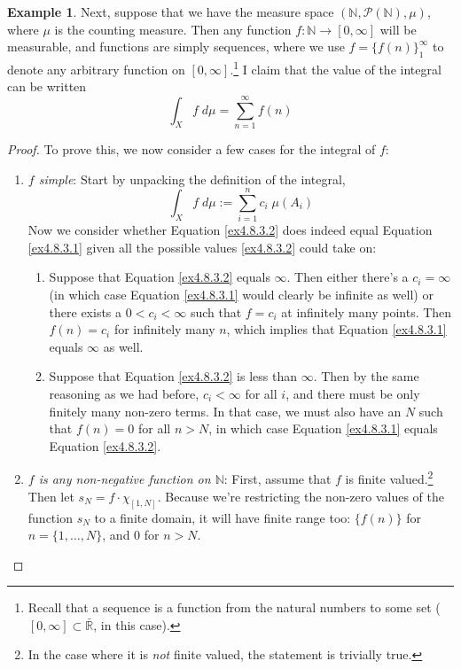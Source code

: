 \documentclass[12pt]{article}
\theoremstyle{plain}
\theoremstyle{definition}
\newtheorem{ex}[thm]{Example}
\theoremstyle{remark}
\begin{document}
\begin{ex}
    Next, suppose that we have the measure space $(\mathbb{N},\mathscr{P}(\mathbb{N}), \mu)$, where $\mu$ is the counting measure. Then any function $f: \mathbb{N}\rightarrow[0,\infty]$  will be measurable, and functions are simply sequences, where we use $f=\{f(n)\}_1^\infty$ to denote any arbitrary function on $[0,\infty]$.\footnote{Recall that a sequence is a function from the natural numbers to some set ($[0,\infty]\subset\bar{\mathbb{R}}$, in this case).} I claim that the value of the integral can be written 
\begin{equation}
    \int_X f \; d\mu = \sum^\infty_{n=1}f(n) 
    \label{ex4.8.3.1}
\end{equation}
\begin{proof}
To prove this, we now consider a few cases for the integral of $f$:
\begin{enumerate}
    \item {\sl $f$ simple}: Start by unpacking the definition of the integral,
    \begin{equation}
        \label{ex4.8.3.2}
        \int_X f \; d\mu := \sum^n_{i=1} c_i \; \mu(A_i)
    \end{equation}
    Now we consider whether Equation \ref{ex4.8.3.2} does indeed equal Equation \ref{ex4.8.3.1} given all the possible values \ref{ex4.8.3.2} could take on:
    \begin{enumerate}
        \item Suppose that Equation \ref{ex4.8.3.2} equals $\infty$. Then either there's a $c_i=\infty$ (in which case Equation \ref{ex4.8.3.1} would clearly be infinite as well) or there exists a $0< c_i<\infty$ such that $f = c_i$ at infinitely many points. Then $f(n)=c_i$ for infinitely many $n$, which implies that Equation \ref{ex4.8.3.1} equals $\infty$ as well.
        \item Suppose that Equation \ref{ex4.8.3.2} is less than $\infty$. Then by the same reasoning as we had before, $c_i<\infty$ for all $i$, and there must be only finitely many non-zero terms. In that case, we must also have an $N$ such that $f(n)=0$ for all $n>N$, in which case Equation \ref{ex4.8.3.1} equals Equation \ref{ex4.8.3.2}.
    \end{enumerate}

\item {\sl $f$ is any non-negative function on $\mathbb{N}$}: First, assume that $f$ is finite valued.\footnote{In the case where it is \emph{not} finite valued, the statement is trivially true.}  Then let $s_N = f\cdot\chi_{[1,N]}$. Because we're restricting the non-zero values of the function $s_N$ to a finite domain, it will have finite range too: $\{f(n)\}$ for $n=\{1,\ldots,N\}$, and 0 for $n>N$. 
    

\end{enumerate}
\end{proof}
\end{ex}
\end{document}
